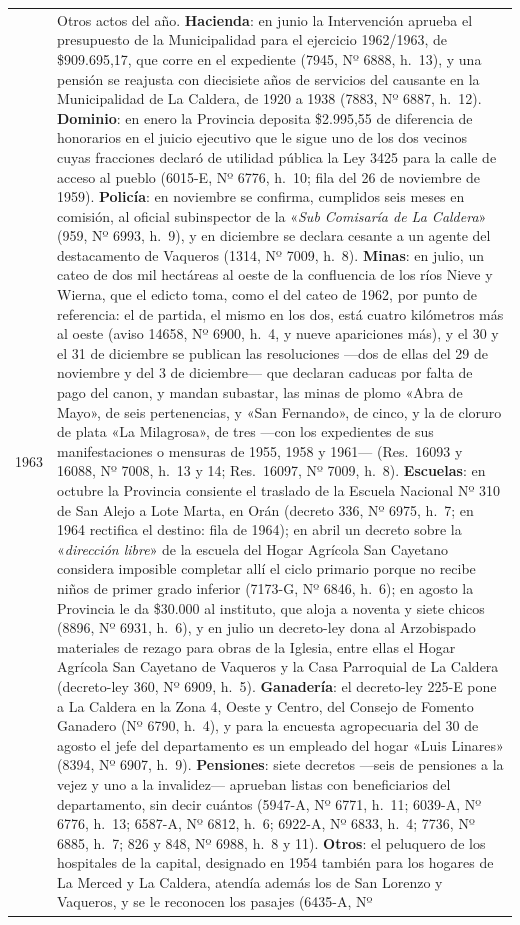 \begin{longtable}{@{}p{2.7cm}p{10.3cm}@{}}
1963 & Otros actos del año. \textbf{Hacienda}: en junio la Intervención aprueba el presupuesto de la Municipalidad para el ejercicio 1962/1963, de \$909.695,17, que corre en el expediente (7945, Nº 6888, h.\ 13), y una pensión se reajusta con diecisiete años de servicios del causante en la Municipalidad de La Caldera, de 1920 a 1938 (7883, Nº 6887, h.\ 12). \textbf{Dominio}: en enero la Provincia deposita \$2.995,55 de diferencia de honorarios en el juicio ejecutivo que le sigue uno de los dos vecinos cuyas fracciones declaró de utilidad pública la Ley 3425 para la calle de acceso al pueblo (6015-E, Nº 6776, h.\ 10; fila del 26 de noviembre de 1959). \textbf{Policía}: en noviembre se confirma, cumplidos seis meses en comisión, al oficial subinspector de la «\textit{Sub Comisaría de La Caldera}» (959, Nº 6993, h.\ 9), y en diciembre se declara cesante a un agente del destacamento de Vaqueros (1314, Nº 7009, h.\ 8). \textbf{Minas}: en julio, un cateo de dos mil hectáreas al oeste de la confluencia de los ríos Nieve y Wierna, que el edicto toma, como el del cateo de 1962, por punto de referencia: el de partida, el mismo en los dos, está cuatro kilómetros más al oeste (aviso 14658, Nº 6900, h.\ 4, y nueve apariciones más), y el 30 y el 31 de diciembre se publican las resoluciones ---dos de ellas del 29 de noviembre y del 3 de diciembre--- que declaran caducas por falta de pago del canon, y mandan subastar, las minas de plomo «Abra de Mayo», de seis pertenencias, y «San Fernando», de cinco, y la de cloruro de plata «La Milagrosa», de tres ---con los expedientes de sus manifestaciones o mensuras de 1955, 1958 y 1961--- (Res.\ 16093 y 16088, Nº 7008, h.\ 13 y 14; Res.\ 16097, Nº 7009, h.\ 8). \textbf{Escuelas}: en octubre la Provincia consiente el traslado de la Escuela Nacional Nº 310 de San Alejo a Lote Marta, en Orán (decreto 336, Nº 6975, h.\ 7; en 1964 rectifica el destino: fila de 1964); en abril un decreto sobre la «\textit{dirección libre}» de la escuela del Hogar Agrícola San Cayetano considera imposible completar allí el ciclo primario porque no recibe niños de primer grado inferior (7173-G, Nº 6846, h.\ 6); en agosto la Provincia le da \$30.000 al instituto, que aloja a noventa y siete chicos (8896, Nº 6931, h.\ 6), y en julio un decreto-ley dona al Arzobispado materiales de rezago para obras de la Iglesia, entre ellas el Hogar Agrícola San Cayetano de Vaqueros y la Casa Parroquial de La Caldera (decreto-ley 360, Nº 6909, h.\ 5). \textbf{Ganadería}: el decreto-ley 225-E pone a La Caldera en la Zona 4, Oeste y Centro, del Consejo de Fomento Ganadero (Nº 6790, h.\ 4), y para la encuesta agropecuaria del 30 de agosto el jefe del departamento es un empleado del hogar «Luis Linares» (8394, Nº 6907, h.\ 9). \textbf{Pensiones}: siete decretos ---seis de pensiones a la vejez y uno a la invalidez--- aprueban listas con beneficiarios del departamento, sin decir cuántos (5947-A, Nº 6771, h.\ 11; 6039-A, Nº 6776, h.\ 13; 6587-A, Nº 6812, h.\ 6; 6922-A, Nº 6833, h.\ 4; 7736, Nº 6885, h.\ 7; 826 y 848, Nº 6988, h.\ 8 y 11). \textbf{Otros}: el peluquero de los hospitales de la capital, designado en 1954 también para los hogares de La Merced y La Caldera, atendía además los de San Lorenzo y Vaqueros, y se le reconocen los pasajes (6435-A, Nº 
\end{longtable}
